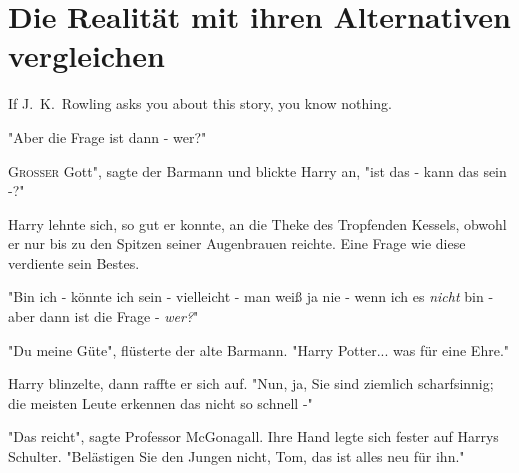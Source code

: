 \chapter{Die Realität mit ihren Alternativen vergleichen}

\begin{chapterOpeningAuthorNote}
If J.~K.~Rowling asks you about this story, you know nothing.
\end{chapterOpeningAuthorNote}

\begin{chapterOpeningQuote}
"Aber die Frage ist dann - wer?"  
\end{chapterOpeningQuote}

\lettrine[ante="]{G}{roßer} Gott", sagte der Barmann und blickte Harry an, "ist das - kann das sein -?" 

Harry lehnte sich, so gut er konnte, an die Theke des Tropfenden Kessels, obwohl er nur bis zu den Spitzen seiner Augenbrauen reichte. Eine Frage wie diese verdiente sein Bestes.

"Bin ich - könnte ich sein - vielleicht - man weiß ja nie - wenn ich es \emph{nicht} bin - aber dann ist die Frage - \emph{wer?}"

"Du meine Güte", flüsterte der alte Barmann. "Harry Potter... was für eine Ehre."

Harry blinzelte, dann raffte er sich auf. "Nun, ja, Sie sind ziemlich scharfsinnig; die meisten Leute erkennen das nicht so schnell -"

"Das reicht", sagte Professor McGonagall. Ihre Hand legte sich fester auf Harrys Schulter. "Belästigen Sie den Jungen nicht, Tom, das ist alles neu für ihn."

